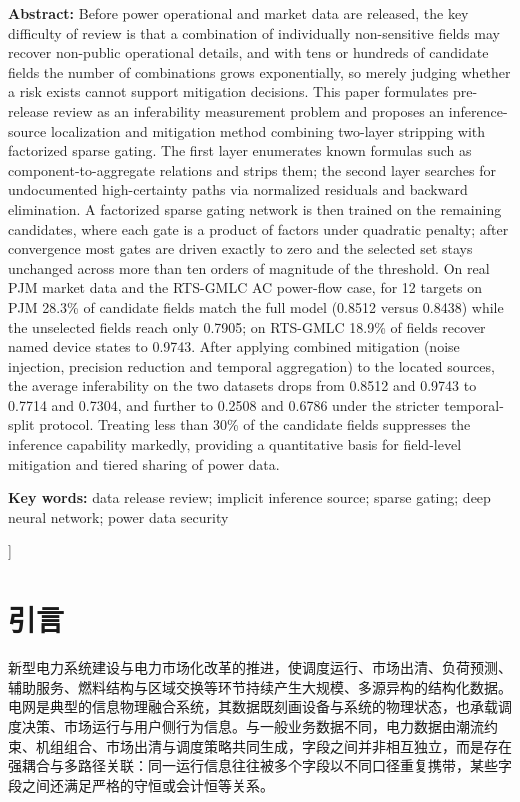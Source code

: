 \documentclass[UTF8,zihao=5,twoside]{ctexart}
\begin{document}
\noindent\textbf{Abstract:} Before power operational and market data are released, the key difficulty of review is that a combination of individually non-sensitive fields may recover non-public operational details, and with tens or hundreds of candidate fields the number of combinations grows exponentially, so merely judging whether a risk exists cannot support mitigation decisions. This paper formulates pre-release review as an inferability measurement problem and proposes an inference-source localization and mitigation method combining two-layer stripping with factorized sparse gating. The first layer enumerates known formulas such as component-to-aggregate relations and strips them; the second layer searches for undocumented high-certainty paths via normalized residuals and backward elimination. A factorized sparse gating network is then trained on the remaining candidates, where each gate is a product of factors under quadratic penalty; after convergence most gates are driven exactly to zero and the selected set stays unchanged across more than ten orders of magnitude of the threshold. On real PJM market data and the RTS-GMLC AC power-flow case, for 12 targets on PJM 28.3\% of candidate fields match the full model (0.8512 versus 0.8438) while the unselected fields reach only 0.7905; on RTS-GMLC 18.9\% of fields recover named device states to 0.9743. After applying combined mitigation (noise injection, precision reduction and temporal aggregation) to the located sources, the average inferability on the two datasets drops from 0.8512 and 0.9743 to 0.7714 and 0.7304, and further to 0.2508 and 0.6786 under the stricter temporal-split protocol. Treating less than 30\% of the candidate fields suppresses the inference capability markedly, providing a quantitative basis for field-level mitigation and tiered sharing of power data.\par
\noindent\textbf{Key words:} data release review; implicit inference source; sparse gating; deep neural network; power data security\par\vspace{0.8em}

\vspace{0.8em}
]

\section{引言}

新型电力系统建设与电力市场化改革的推进，使调度运行、市场出清、负荷预测、辅助服务、燃料结构与区域交换等环节持续产生大规模、多源异构的结构化数据\cite{ref-liu-cps,ref-ma-pjm}。电网是典型的信息物理融合系统，其数据既刻画设备与系统的物理状态，也承载调度决策、市场运行与用户侧行为信息。与一般业务数据不同，电力数据由潮流约束、机组组合、市场出清与调度策略共同生成，字段之间并非相互独立，而是存在强耦合与多路径关联：同一运行信息往往被多个字段以不同口径重复携带，某些字段之间还满足严格的守恒或会计恒等关系。
\end{document}
